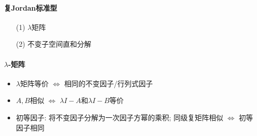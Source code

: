 \paragraph{复Jordan标准型}
\begin{itemize}
    \item[(1)] $\lambda$矩阵
    \item[(2)] 不变子空间直和分解
\end{itemize}

\paragraph{$\lambda$-矩阵}
\begin{itemize}
    \item $\lambda$矩阵等价 $\Longleftrightarrow$ 相同的不变因子/行列式因子
    \item $A,B$相似 $\Longleftrightarrow$ $\lambda I-A$和$\lambda I-B$等价
    \item 初等因子: 将不变因子分解为一次因子方幂的乘积; 同级复矩阵相似 $\Longleftrightarrow$ 初等因子相同
\end{itemize}

